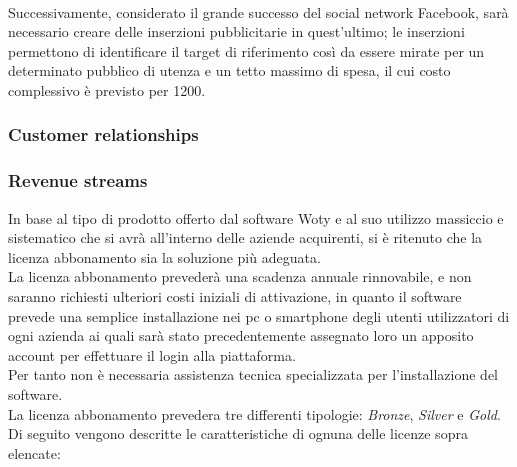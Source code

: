\\
Successivamente, considerato il grande successo del social network Facebook, sarà necessario creare delle inserzioni pubblicitarie in quest'ultimo; le inserzioni permettono di identificare il target di riferimento così da essere mirate per un determinato pubblico di utenza e un tetto massimo di spesa, il cui costo complessivo è previsto per 1200\EUR.





\subsubsection{Customer relationships}


\subsubsection{Revenue streams}
In base al tipo di prodotto offerto dal software Woty e al suo utilizzo massiccio e sistematico che si avrà all'interno delle aziende acquirenti, si è ritenuto che la licenza abbonamento sia la soluzione più adeguata.\\
La licenza abbonamento prevederà una scadenza annuale rinnovabile, e non saranno richiesti ulteriori costi iniziali di attivazione, in quanto il software prevede una semplice installazione nei pc o smartphone degli utenti utilizzatori di ogni azienda ai quali sarà stato precedentemente assegnato loro un apposito account per effettuare il login alla piattaforma.\\
Per tanto non è necessaria assistenza tecnica specializzata per l'installazione del software.\\
La licenza abbonamento prevedera tre differenti tipologie: \textit{Bronze}, \textit{Silver} e \textit{Gold}.
Di seguito vengono descritte le caratteristiche di ognuna delle licenze sopra elencate:


